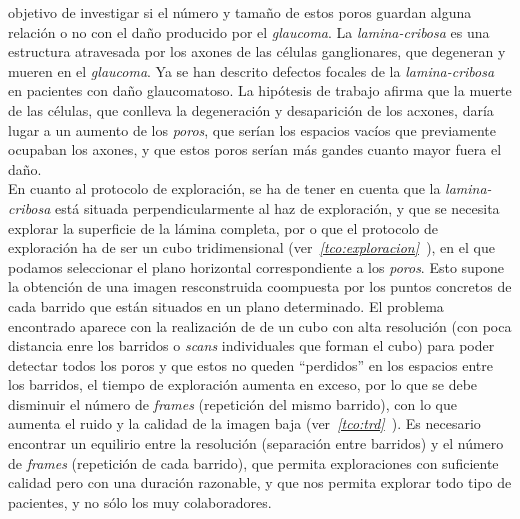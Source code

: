 objetivo de investigar si el número y tamaño de estos poros guardan
alguna relación o no con el daño producido por el
\emph{\gls{glaucoma}}. La \emph{\gls{lamina-cribosa}} es una
estructura atravesada por los axones de las células ganglionares, que
degeneran y mueren en el \emph{\gls{glaucoma}}. Ya se han descrito
defectos focales de la \emph{\gls{lamina-cribosa}} en pacientes con
daño glaucomatoso. La hipótesis de trabajo afirma que la muerte de las
células, que conlleva la degeneración y desaparición de los acxones,
daría lugar a un aumento de los \emph{poros}, que serían los espacios
vacíos que previamente ocupaban los axones, y que estos poros
serían más gandes cuanto mayor fuera el daño. \\
En cuanto al protocolo de exploración, se ha de tener en cuenta que la
\emph{\gls{lamina-cribosa}} está situada perpendicularmente al haz de
exploración, y que se necesita explorar la superficie de la lámina
completa, por o que el protocolo de exploración ha de ser un cubo
tridimensional
(ver\emph{~\ref{tco:exploracion}~}), en el
que podamos seleccionar el plano horizontal correspondiente a los
\emph{poros}. Esto supone la obtención de una imagen resconstruida
coompuesta por los puntos concretos de cada barrido que están situados
en un plano determinado. El problema encontrado aparece con la
realización de de un cubo con alta resolución (con poca distancia enre
los barridos o \emph{scans} individuales que forman el cubo) para
poder detectar todos los poros y que estos no queden ``perdidos'' en
los espacios entre los barridos, el tiempo de exploración aumenta en
exceso, por lo que se debe disminuir el número de \emph{frames}
(repetición del mismo barrido), con lo que aumenta el ruido y la
calidad de la imagen baja
(ver\emph{~\ref{tco:trd}~}). Es necesario encontrar
un equilirio entre la resolución (separación entre barridos) y el
número de \emph{frames} (repetición de cada barrido), que permita
exploraciones con suficiente calidad pero con una duración razonable,
y que nos permita explorar todo tipo de pacientes, y no sólo los muy
colaboradores.
